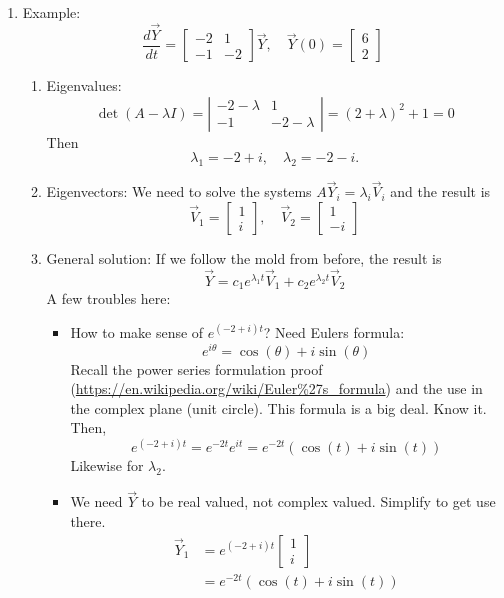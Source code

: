 \documentclass{article}
\begin{document}
\begin{enumerate}
\item Example:
\[
\frac{d\vec{Y}}{dt} = 
\begin{bmatrix}
-2 & 1 \\
-1 & -2
\end{bmatrix} \vec{Y}, \quad \vec{Y}(0) = 
\begin{bmatrix}
6 \\ 2
\end{bmatrix}
\]
\begin{enumerate}
\item Eigenvalues:
\[
\det(A-\lambda I) = \left|
\begin{array}{cc}
-2-\lambda & 1 \\
-1 & -2-\lambda
\end{array}
\right|
= (2+\lambda)^2 + 1 =0
\]
Then 
\[
\lambda_1 = -2 + i, \quad \lambda_2 = -2 - i.
\]
\item Eigenvectors: We need to solve the systems $A \vec{Y}_i = \lambda_i \vec{V}_i$ and the result is
\[
\vec{V}_1 = 
\begin{bmatrix}
1 \\ i
\end{bmatrix}
, \quad
\vec{V}_2 = 
\begin{bmatrix}
1 \\ -i
\end{bmatrix}
\]
\item General solution: If we follow the mold from before, the result is
\[
\vec{Y} = c_1 e^{\lambda_1 t} \vec{V}_1 +  c_2 e^{\lambda_2 t} \vec{V}_2
\]
A few troubles here:
\begin{itemize}
\item How to make sense of $e^{(-2+i)t}$? Need Eulers formula:
\[
e^{i\theta} = \cos(\theta) + i \sin(\theta)
\]
Recall the power series formulation proof (\url{https://en.wikipedia.org/wiki/Euler%27s_formula}) and the use in the complex plane (unit circle). This formula is a big deal. Know it. Then,
\[
e^{(-2+i)t} = e^{-2t}e^{it} = e^{-2t}(\cos(t)+i\sin(t))
\]
Likewise for $\lambda_2$.
\item We need $\vec{Y}$ to be real valued, not complex valued. Simplify to get use there.
\begin{align*}
\vec{Y}_1 
&= e^{(-2+i) t} 
\begin{bmatrix}
1 \\ i
\end{bmatrix} \\
&= e^{-2t}(\cos(t)+i\sin(t)) 

\end{align*}
\end{itemize}
\end{enumerate}
\end{enumerate}
\end{document}
